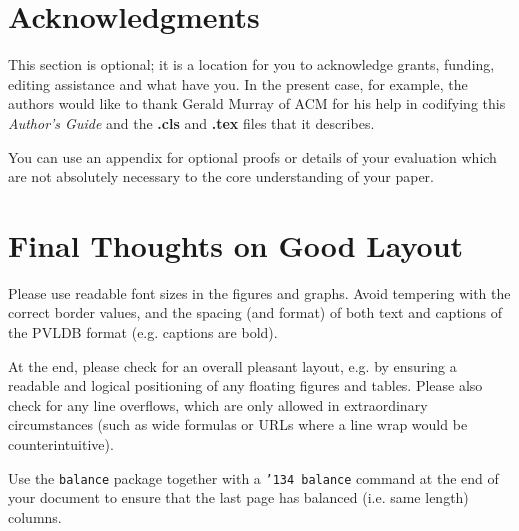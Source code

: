 \documentclass{vldb}
\begin{document}
\section{Acknowledgments}
This section is optional; it is a location for you
to acknowledge grants, funding, editing assistance and
what have you.  In the present case, for example, the
authors would like to thank Gerald Murray of ACM for
his help in codifying this \textit{Author's Guide}
and the \textbf{.cls} and \textbf{.tex} files that it describes.





\begin{appendix}
You can use an appendix for optional proofs or details of your evaluation which are not absolutely necessary to the core understanding of your paper. 

\section{Final Thoughts on Good Layout}
Please use readable font sizes in the figures and graphs. Avoid tempering with the correct border values, and the spacing (and format) of both text and captions of the PVLDB format (e.g. captions are bold).

At the end, please check for an overall pleasant layout, e.g. by ensuring a readable and logical positioning of any floating figures and tables. Please also check for any line overflows, which are only allowed in extraordinary circumstances (such as wide formulas or URLs where a line wrap would be counterintuitive).

Use the \texttt{balance} package together with a \texttt{\char'134 balance} command at the end of your document to ensure that the last page has balanced (i.e. same length) columns.

\end{appendix}
\end{document}
